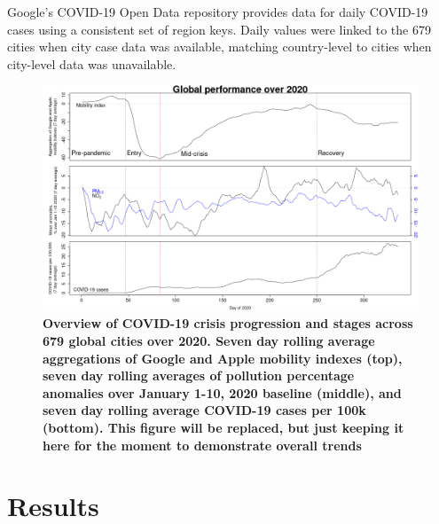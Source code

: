 \documentclass[preprint,12pt]{elsarticle}
\begin{document}
Google's COVID-19 Open Data repository \cite{Google2022} provides data for daily COVID-19 cases using a consistent set of region keys. Daily values were linked to the 679 cities when city case data was available, matching country-level to cities when city-level data was unavailable.









\begin{figure}
\centering
\includegraphics[trim={0 0 15 20},clip,scale=0.45]{Images/LancetPHOverall.png}
\caption{\bf Overview of COVID-19 crisis progression and stages across 679 global cities over 2020. Seven day rolling average aggregations of Google and Apple mobility indexes (top), seven day rolling averages of pollution percentage anomalies over January 1-10, 2020 baseline (middle), and seven day rolling average COVID-19 cases per 100k (bottom). This figure will be replaced, but just keeping it here for the moment to demonstrate overall trends}
 \label{fig:stages}
\end{figure}

\section*{Results}
\end{document}

